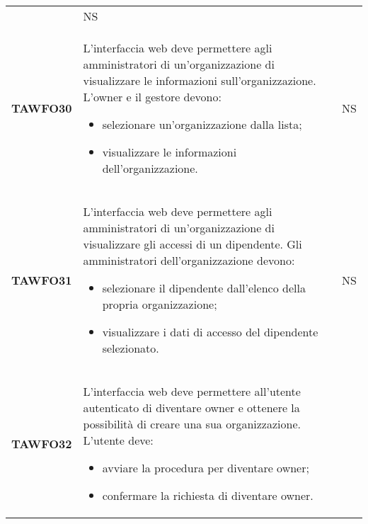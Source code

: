 \documentclass[../piano-di-qualifica.tex]{subfiles}
\begin{document}
\begin{longtable}[H]{>{\centering\bfseries}m{3cm} >{}m{11cm} >{\centering\arraybackslash}m{2cm}}
\begin{itemize}
  \end{itemize}
                                  & NS                                                                                                                                                                                                                                   \\
  TAWFO30                         & L’interfaccia web deve permettere agli amministratori di un’organizzazione di visualizzare le informazioni sull’organizzazione. \newline
  L’owner e il gestore devono:
  \begin{itemize}
    \item selezionare un'organizzazione dalla lista;
    \item visualizzare le informazioni dell'organizzazione.
  \end{itemize}
                                  & NS                                                                                                                                                                                                                                   \\
  TAWFO31                         & L’interfaccia web deve permettere agli amministratori di un’organizzazione di visualizzare gli accessi di un dipendente. \newline
  Gli amministratori dell'organizzazione devono:
  \begin{itemize}
    \item selezionare il dipendente dall'elenco della propria organizzazione;
    \item visualizzare i dati di accesso del dipendente selezionato.
  \end{itemize}
                                  & NS                                                                                                                                                                                                                                   \\
  TAWFO32                         & L’interfaccia web deve permettere all’utente autenticato di diventare owner e ottenere la possibilità di creare una sua organizzazione. \newline
  L'utente deve:
  \begin{itemize}
    \item avviare la procedura per diventare owner;
    \item confermare la richiesta di diventare owner.

\end{itemize}
\end{longtable}
\end{document}
